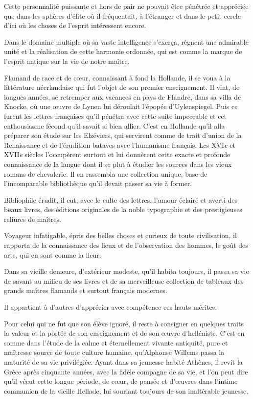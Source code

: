 \documentclass{book}%
\newcommand{\italique}[1]{\textit{#1}}%
\newcommand{\nieme}[1]{#1\italique{e}}%
\begin{document}
Cette personnalité puissante et hors de pair ne pouvait être pénétrée et appréciée que dans les sphères d'élite où il fréquentait, à l'étranger et dans le petit cercle d'ici où les choses de l'esprit intéressent encore. 

Dans le domaine multiple où sa vaste intelligence s'exerça, règnent une admirable unité et la réalisation de cette harmonie ordonnée, qui est comme la marque de l'esprit antique sur la vie de notre maître. 

Flamand de race et de cœur, connaissant à fond la Hollande, il se voua à la littérature néerlandaise qui fut l'objet de son premier enseignement. 
Il vint, de longues années, se retremper aux vacances en pays de Flandre, dans sa villa de Knocke, où une œuvre de Lynen lui déroulait l'épopée d'Uylenspiegel. 
Puis ce furent les lettres françaises qu'il pénétra avec cette suite impeccable et cet enthousiasme fécond qu'il savait si bien allier. 
C'est en Hollande qu'il alla préparer son étude sur les Elzéviers, qui servirent comme de trait d'union de la Renaissance et de l'érudition bataves avec l'humanisme français. 
Les \nieme{XVI} et \nieme{XVII} siècles l'occupèrent surtout et lui donnèrent cette exacte et profonde connaissance de la langue dont il se plut à étudier les sources dans les vieux romans de chevalerie. Il en rassembla une collection unique, base de l'incomparable bibliothèque qu'il devait passer sa vie à former. 

Bibliophile érudit, il eut, avec le culte des lettres, l'amour éclairé et averti des beaux livres, des éditions originales de la noble typographie et des prestigieuses reliures de maîtres. 

Voyageur infatigable, épris des belles choses et curieux de toute civilisation, il rapporta de la connaissance des lieux et de l'observation des hommes, le goût des arts, qui en sont comme la fleur. 

Dans sa vieille demeure, d'extérieur modeste, qu'il habita toujours, il passa sa vie de savant au milieu de ses livres et de sa merveilleuse collection de tableaux des grands maîtres flamands et surtout français modernes. 

Il appartient à d'autres d'apprécier avec compétence ces hauts mérites. 

Pour celui qui ne fut que son élève ignoré, il reste à consigner en quelques traits la valeur et la portée de son enseignement et de son œuvre d'helléniste. 
C'est en somme dans l'étude de la calme et éternellement vivante antiquité, pure et maîtresse source de toute culture humaine, qu'Alphonse Willems passa la maturité de sa vie privilégiée. 
Ayant dans sa jeunesse habité Athènes, il revit la Grèce après cinquante années, avec la fidèle compagne de sa vie, et l'on peut dire qu'il vécut cette longue période, de cœur, de pensée et d'œuvres dans l'intime communion de la vieille Hellade, lui souriant toujours de son inaltérable jeunesse. 
\end{document}
